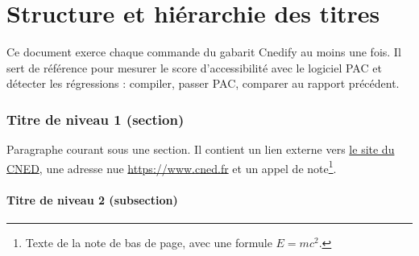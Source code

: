 %
%
%
%

\part{Structure et hiérarchie des titres}

Ce document exerce chaque commande du gabarit Cnedify au moins une fois. Il sert de référence pour mesurer le score d'accessibilité avec le logiciel PAC et détecter les régressions : compiler, passer PAC, comparer au rapport précédent.

\section{Titre de niveau 1 (section)}

Paragraphe courant sous une section. Il contient un lien externe vers \href{https://www.cned.fr}{le site du CNED}, une adresse nue \url{https://www.cned.fr} et un appel de note\footnote{Texte de la note de bas de page, avec une formule \( E = mc^2 \).}.

\subsection{Titre de niveau 2 (subsection)}

